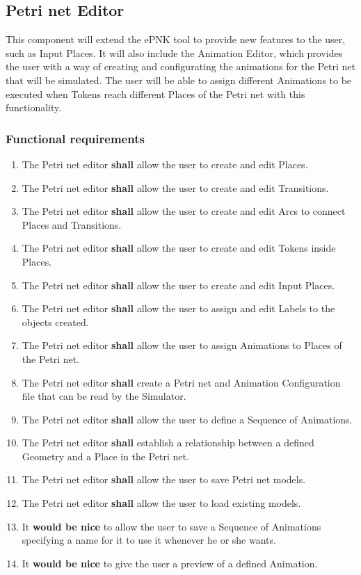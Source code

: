 \subsection{Petri net Editor}

This component will extend the ePNK tool to provide new features to the user, 
such as Input Places. It will also include the Animation Editor, which provides the user with a way of 
creating and configurating the animations for the Petri net that will be simulated. The user will be able 
to assign different Animations to be executed when Tokens reach different Places of the Petri net with this functionality.

\subsubsection{Functional requirements}

\begin{enumerate}
  \item The Petri net editor \textbf{shall} allow the user to create and edit Places.
  \item The Petri net editor \textbf{shall} allow the user to create and edit Transitions.
  \item The Petri net editor \textbf{shall} allow the user to create and edit Arcs to connect Places and Transitions.
  \item The Petri net editor \textbf{shall} allow the user to create and edit Tokens inside Places.
  \item The Petri net editor \textbf{shall} allow the user to create and edit Input Places.
  \item The Petri net editor \textbf{shall} allow the user to assign and edit Labels to the objects created.
  \item The Petri net editor \textbf{shall} allow the user to assign Animations to Places of the Petri net.
  \item The Petri net editor \textbf{shall} create a Petri net and Animation Configuration file that can be read by the Simulator.
  \item The Petri net editor \textbf{shall} allow the user to define a Sequence of Animations.
  \item The Petri net editor \textbf{shall} establish a relationship between a defined Geometry and a Place in the Petri net.
  \item The Petri net editor \textbf{shall} allow the user to save Petri net models.
  \item The Petri net editor \textbf{shall} allow the user to load existing models.
  \item It \textbf{would be nice} to allow the user to save a Sequence of Animations specifying a name for it to use it whenever he or she wants.
  \item It \textbf{would be nice} to give the user a preview of a defined Animation.
\end{enumerate}


